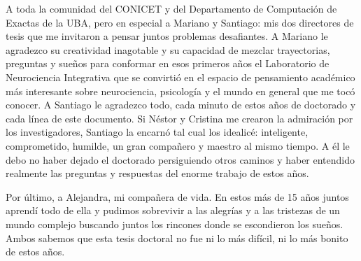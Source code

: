 A toda la comunidad del CONICET y del Departamento de Computación de Exactas de la UBA, pero en especial a Mariano y Santiago: mis dos directores de tesis que me invitaron a pensar juntos problemas desafiantes. A Mariano le agradezco su creatividad inagotable y su capacidad de mezclar trayectorias, preguntas y sueños para conformar en esos primeros años el Laboratorio de Neurociencia Integrativa que se convirtió en el espacio de pensamiento académico más interesante sobre neurociencia, psicología y el mundo en general que me tocó conocer. A Santiago le agradezco todo, cada minuto de estos años de doctorado y cada línea de este documento. Si Néstor y Cristina me crearon la admiración por los investigadores, Santiago la encarnó tal cual los idealicé: inteligente, comprometido, humilde, un gran compañero y maestro al mismo tiempo. A él le debo no haber dejado el doctorado persiguiendo otros caminos y haber entendido realmente las preguntas y respuestas del enorme trabajo de estos años.

Por último, a Alejandra, mi compañera de vida. En estos más de 15 años juntos aprendí todo de ella y pudimos sobrevivir a las alegrías y a las tristezas de un mundo complejo buscando juntos los rincones donde se escondieron los sueños. Ambos sabemos que esta tesis doctoral no fue ni lo más difícil, ni lo más bonito de estos años.